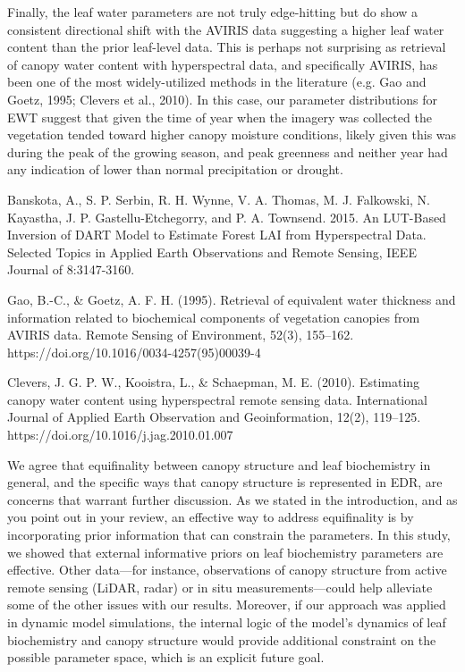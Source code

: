 Finally, the leaf water parameters are not truly edge-hitting but do show a consistent directional shift with the AVIRIS data suggesting a higher leaf water content than the prior leaf-level data. This is perhaps not surprising as retrieval of canopy water content with hyperspectral data, and specifically AVIRIS, has been one of the most widely-utilized methods in the literature (e.g. Gao and Goetz, 1995; Clevers et al., 2010). In this case, our parameter distributions for EWT suggest that given the time of year when the imagery was collected the vegetation tended toward higher canopy moisture conditions, likely given this was during the peak of the growing season, and peak greenness and neither year had any indication of lower than normal precipitation or drought.

\medskip
\noindent Banskota, A., S. P. Serbin, R. H. Wynne, V. A. Thomas, M. J. Falkowski, N. Kayastha, J. P. Gastellu-Etchegorry, and P. A. Townsend. 2015. An LUT-Based Inversion of DART Model to Estimate Forest LAI from Hyperspectral Data. Selected Topics in Applied Earth Observations and Remote Sensing, IEEE Journal of 8:3147-3160.

\medskip
\noindent Gao, B.-C., \& Goetz, A. F. H. (1995). Retrieval of equivalent water thickness and information related to biochemical components of vegetation canopies from AVIRIS data. Remote Sensing of Environment, 52(3), 155–162. https://doi.org/10.1016/0034-4257(95)00039-4

\medskip
\noindent Clevers, J. G. P. W., Kooistra, L., \& Schaepman, M. E. (2010). Estimating canopy water content using hyperspectral remote sensing data. International Journal of Applied Earth Observation and Geoinformation, 12(2), 119–125. https://doi.org/10.1016/j.jag.2010.01.007

We agree that equifinality between canopy structure and leaf biochemistry in general, and the specific ways that canopy structure is represented in EDR, are concerns that warrant further discussion. As we stated in the introduction, and as you point out in your review, an effective way to address equifinality is by incorporating prior information that can constrain the parameters. In this study, we showed that external informative priors on leaf biochemistry parameters are effective. Other data---for instance, observations of canopy structure from active remote sensing (LiDAR, radar) or in situ measurements---could help alleviate some of the other issues with our results. Moreover, if our approach was applied in dynamic model simulations, the internal logic of the model’s dynamics of leaf biochemistry and canopy structure would provide additional constraint on the possible parameter space, which is an explicit future goal.

